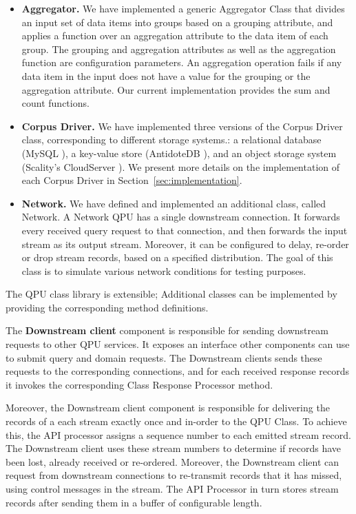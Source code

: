 \begin{itemize}
  \item \textbf{Aggregator.}
  We have implemented a generic Aggregator Class that divides an input set of data items into groups based on a grouping attribute,
  and applies a function over an aggregation attribute to the data item of each group.
  The grouping and aggregation attributes as well as the aggregation function are configuration parameters.
  An aggregation operation fails if any data item in the input does not have a value for  the grouping or the aggregation attribute.
  Our current implementation provides the sum and count functions.

  \item \textbf{Corpus Driver.}
  We have implemented three versions of the Corpus Driver class, corresponding to different storage systems.:
  a relational database (MySQL \cite{mysql:docs}), a key-value store (AntidoteDB \cite{antidotedb:docs}),
  and an object storage system (Scality's CloudServer \cite{cloudserver:github}).
  We present more details on the implementation of each Corpus Driver in Section~\ref{sec:implementation}.

  \item \textbf{Network.}
  We have defined and implemented an additional class, called Network.
  A Network QPU has a single downstream connection.
  It forwards every received query request to that connection, and then forwards the input stream as its output stream.
  Moreover, it can be configured to delay, re-order or drop stream records, based on a specified distribution.
  The goal of this class is to simulate various network conditions for testing purposes.


\end{itemize}

The QPU class library is extensible;
Additional classes can be implemented by providing the corresponding method definitions.

\bigskip
\noindent
The \textbf{Downstream client} component is responsible for sending downstream requests to other QPU services.
It exposes an interface other components can use to submit query and domain requests.
The Downstream clients sends these requests to the corresponding connections,
and for each received response records it invokes the corresponding Class Response Processor method.

Moreover, the Downstream client component is responsible for delivering the records of a each stream exactly once and in-order
to the QPU Class.
To achieve this, the API processor assigns a sequence number to each emitted stream record.
The Downstream client uses these stream numbers to determine if records have been lost, already received or re-ordered.
Moreover, the Downstream client can request from downstream connections to re-transmit records that it has missed,
using control messages in the stream.
The API Processor in turn stores stream records after sending them in a buffer of configurable length.



